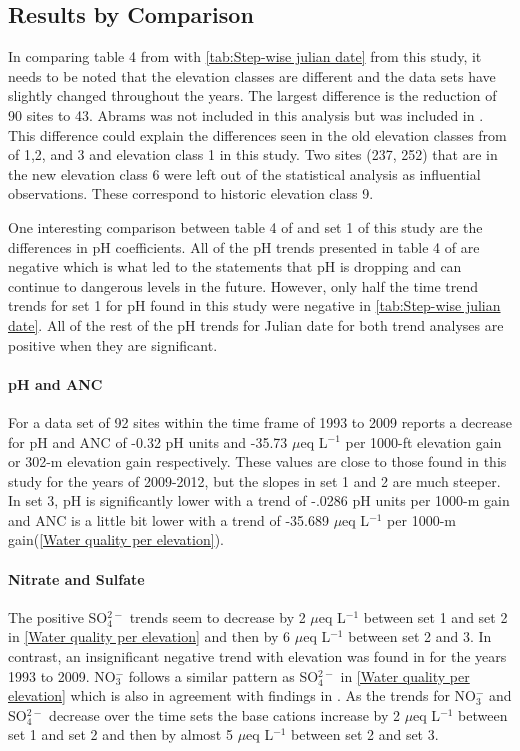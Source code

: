 \subsection{Results by Comparison}

In comparing table 4 from \citet{robinson2008ph} with \autoref{tab:Step-wise julian date} from this study, it needs to be noted that the elevation classes are different and the data sets have slightly changed throughout the years. 
The largest difference is the reduction of 90 sites to 43. Abrams was not included in this analysis but was included in \citet{robinson2008ph}. 
This difference could explain the differences seen in the old elevation classes from \citet{robinson2008ph} of 1,2, and 3 and elevation class 1 in this study. 
Two sites (237, 252) that are in the new elevation class 6 were left out of the statistical analysis as influential observations. 
These correspond to historic elevation class 9.

One interesting comparison between table 4 of \citet{robinson2008ph} and set 1 of this study are the differences in pH coefficients. 
All of the pH trends presented in table 4 of \citet{robinson2008ph} are negative which is what led to the statements that pH is dropping and can continue to dangerous levels in the future.
 However, only half the time trend trends for set 1 for pH found in this study were negative in \autoref{tab:Step-wise julian date}. 
All of the rest of the pH trends for Julian date for both trend analyses are positive when they are significant.

\paragraph{pH and ANC}
For a data set of 92 sites within the time frame of 1993 to 2009 \citet{cai2012} reports a decrease for pH and ANC of -0.32 pH units and -35.73 $\mu$eq L$^{-1}$ per 1000-ft elevation gain or 302-m elevation gain respectively.  
These values are close to those found in this study for the years of 2009-2012, but the slopes in set 1 and 2 are much steeper. 
 In set 3, pH is significantly lower with a trend of -.0286 pH units per 1000-m gain and ANC is a little bit lower with a trend of -35.689 $\mu$eq L$^{-1}$ per 1000-m gain(\autoref{Water quality per elevation}).  

\paragraph{Nitrate and Sulfate}
The positive SO$_4^{2-}$ trends seem to decrease by 2 $\mu$eq L$^{-1}$ between set 1 and set 2 in \autoref{Water quality per elevation} and then by 6  $\mu$eq L$^{-1}$ between set 2 and 3. 
 In contrast, an insignificant negative trend with elevation was found in \citet{cai2012} for the years 1993 to 2009.  
NO$_3^-$ follows a similar pattern as SO$_4^{2-}$ in \autoref{Water quality per elevation} which is also in agreement with findings in \citet{weathers2006}.  
As the trends for  NO$_3^-$ and SO$_4^{2-}$ decrease over the time sets the base cations increase by 2 $\mu$eq L$^{-1}$ between set 1 and set 2 and then by almost 5 $\mu$eq L$^{-1}$ between set 2 and set 3.

